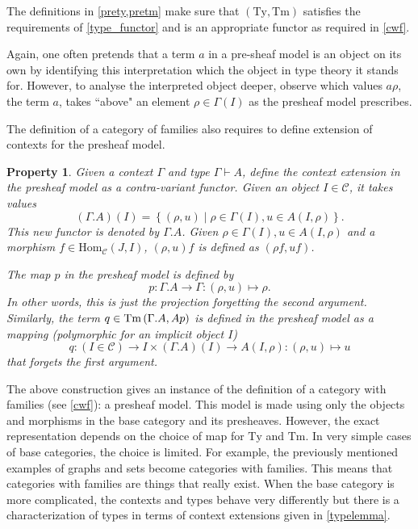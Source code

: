 \documentclass[12pt,a4paper,twoside,xetex]{book}
\newtheorem{property}[theorem]{Property}
\begin{document}
The definitions in \cref{prety,pretm} make sure that $(\text{Ty},\text{Tm})$  
satisfies the requirements of \cref{type_functor} and is an appropriate functor 
as required in \cref{cwf}.


Again, one often pretends that a term $a$ in a pre-sheaf model is an object on 
its own by identifying this interpretation which the object in type theory it 
stands for. However, to analyse the interpreted object deeper, 
observe which values $a\rho$, the term $a$, takes ``above" an element $\rho 
\in \Gamma (I)$ as the presheaf model prescribes.

The definition of a category of families also requires to define extension 
of contexts for the presheaf model. 

\begin{property}\label{preext}
Given a context $\Gamma$ and type $\Gamma \vdash A$, define the context 
extension in the presheaf model as a contra-variant functor. Given an object $I 
\in \mathcal{C}$, it takes values $$(\Gamma . A)(I) = \left\{ (\rho , u) \mid 
\rho \in \Gamma (I) , u \in A (I, \rho ) \right\}.$$ This new functor is 
denoted by $\Gamma . A$. Given $\rho \in \Gamma (I), u \in A(I,\rho )$ and a 
morphism $f \in \text{Hom}_{\mathcal{C}}(J,I)$, $(\rho, u)f$ is defined as 
$(\rho f, uf)$. 


The map $p$ in the presheaf model is defined by $$p: \Gamma . A \rightarrow 
\Gamma : (\rho , u ) \mapsto \rho.$$ In other words, this is just the 
projection forgetting the second argument. Similarly, the term $q \in 
\text{Tm}\left(\Gamma . A,Ap\right) $ is defined in the presheaf model  as a mapping 
(polymorphic for an implicit object $I$) $$q: (I \in \mathcal{C}) \rightarrow I 
\times (\Gamma . A)(I) \rightarrow A(I,\rho): (\rho, u) \mapsto u$$ that 
forgets the first argument.
\end{property}

The above construction gives an instance of the definition of a category with 
families (see \cref{cwf}): a presheaf model. This model is made using only the 
objects and morphisms in the base category and its presheaves. However, the 
exact representation depends on the choice of map for $\text{Ty}$ and 
$\text{Tm}$. In very simple cases of base categories, the choice is limited. 
For example, the previously mentioned examples of graphs and sets become 
categories with families. This means that categories with families are things 
that really exist. When the base category is more complicated, the contexts and 
types behave very differently but there is a characterization of types in terms 
of context extensions given in \cref{typelemma}.
\end{document}
